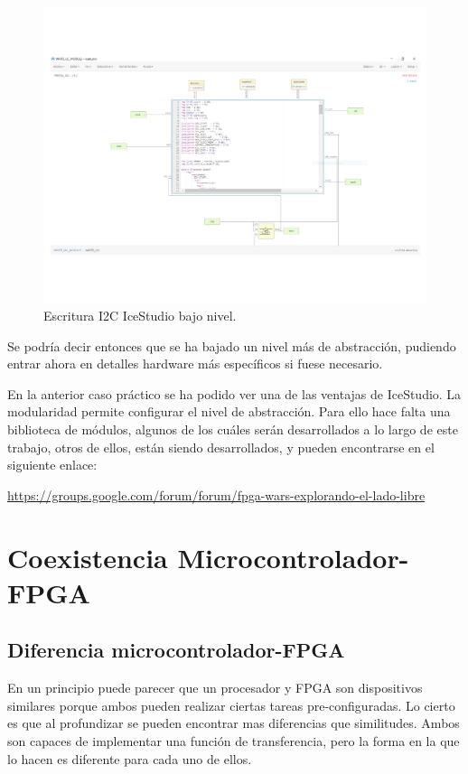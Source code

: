 \begin{figure}[H]
	\center
	\includegraphics[trim = 0mm 1.5cm 0mm 0mm, clip,scale=0.4]{imagenes/EstadoArte/Write_i2c_module2.pdf}
	\caption{Escritura I2C IceStudio bajo nivel.}
	\label{fig:Write_i2c_module2}
\end{figure}

Se podría decir entonces que se ha bajado un nivel más de abstracción, pudiendo entrar ahora en detalles hardware más específicos si fuese necesario. \newline

En la anterior caso práctico se ha podido ver una de las ventajas de IceStudio. La modularidad permite configurar el nivel de abstracción.
Para ello hace falta una biblioteca de módulos, algunos de los cuáles serán desarrollados a lo largo de este trabajo, otros de ellos, están siendo desarrollados, y pueden encontrarse en el siguiente enlace: 

\href{https://groups.google.com/forum/#!forum/fpga-wars-explorando-el-lado-libre}{https://groups.google.com/forum/forum/fpga-wars-explorando-el-lado-libre}


\section{Coexistencia Microcontrolador-FPGA}\label{sec:coexistencia}
\subsection{Diferencia microcontrolador-FPGA}
En un principio puede parecer que un procesador y FPGA son dispositivos similares porque ambos pueden realizar ciertas tareas pre-configuradas. Lo cierto es que al profundizar se pueden encontrar mas diferencias que similitudes. Ambos son capaces de implementar una función de transferencia, pero la forma en la que lo hacen es diferente para cada uno de ellos.\newline

